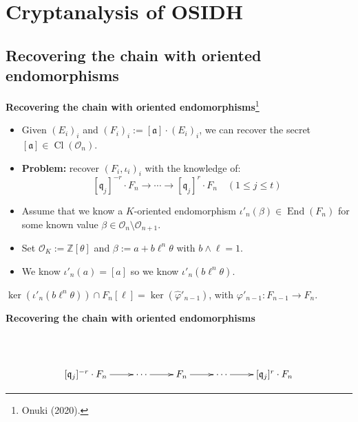 \documentclass[10pt]{beamer}
\theoremstyle{plain}
\theoremstyle{definition}
\newcommand{\Z}{\mathbb{Z}}
\newcommand{\mO}{\mathcal{O}}
\renewcommand{\(}{\left(}
\renewcommand{\)}{\right)}
\newcommand{\mf}[1]{\mathfrak{#1}}
\newcommand{\mfq}{\mathfrak{q}}
\DeclareMathOperator{\End}{End}
\DeclareMathOperator{\Cl}{Cl}
\begin{document}
\section{Cryptanalysis of OSIDH}

\subsection{Recovering the chain with oriented endomorphisms}

\begin{frame}
\textbf{Recovering the chain with oriented endomorphisms}\footnote[frame]{Onuki (2020).}

\vspace{0.5cm}

\begin{itemize}
\item Given $(E_i)_{i}$ and $(F_i)_{i}:=[\mf{a}]\cdot(E_i)_{i}$, we can recover the secret $[\mf{a}]\in\Cl(\mO_n)$.

\pause

\item \textbf{Problem:} recover $(F_i,\iota_i)_{i}$ with the knowledge of:
\[[\mfq_j]^{-r}\cdot F_{n}\longrightarrow \cdots\longrightarrow [\mfq_j]^{r}\cdot F_{n} \quad (1\leq j\leq t)\]

\pause

\item Assume that we know a $K$-oriented endomorphism $\iota'_n(\beta)\in\End(F_n)$ for some known value $\beta\in\mO_n\setminus\mO_{n+1}$.

\pause

\item Set $\mO_K:=\Z[\theta]$ and $\beta:=a+b\ell^n\theta$ with $b\wedge\ell=1$.

\item We know $\iota'_n(a)=[a]$ so we know $\iota'_n(b\ell^n\theta)$.
\end{itemize}

\pause

\begin{lemma}
$\ker(\iota'_n(b\ell^n\theta))\cap F_n[\ell]=\ker(\widehat{\varphi}'_{n-1})$, with $\varphi'_{n-1}:F_{n-1}\longrightarrow F_n$.
\end{lemma}

\end{frame}

\begin{frame}
\textbf{Recovering the chain with oriented endomorphisms}

\vspace{0.5cm}

\[\xymatrix{
 										      &                     &  & &\\
[\mf{q}_j]^{-r}\cdot F_n \ar[r] & \cdots \ar[r]& F_n \ar[r] & \cdots \ar[r]& [\mf{q}_j]^r\cdot F_n\\
}\]
\end{frame}
\end{document}
